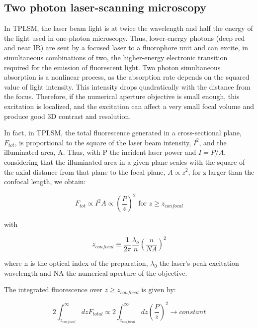 \subsection{Two photon laser-scanning microscopy }

In TPLSM, the laser beam light is at twice the wavelength and half the energy of the light used in one-photon microscopy. Thus, lower-energy photons (deep red and near IR) are sent by a focused laser to a fluorophore unit and can excite, in simultaneous combinations of two, the higher-energy electronic transition required for the emission of fluorescent light. Two photon simultaneous absorption is a nonlinear process, as the absorption rate depends on the squared value of light intensity. This intensity drops quadratically with the distance from the focus. Therefore, if the numerical aperture objective is small enough, this excitation is localized, and the excitation can affect a very small focal volume and produce good 3D contrast and resolution.

In fact, in TPLSM, the total fluorescence generated in a cross-sectional plane, $F_{tot}$, is proportional to the square of the laser beam intensity, $I^2$, and the illuminated area, A. Thus, with P the incident laser power and $I=P/A$, considering that the illuminated area in a given plane scales with the square of the axial distance from that plane to the focal plane, $A \propto z^2$, for z larger than the confocal length, we obtain:

\begin{equation}
F_ {tot} \propto I^2 A \propto \left( \dfrac{P}{z}\right)^2 \text{ for } z \geqslant z_{confocal}
\end{equation}

with

\begin{equation}
z_{confocal}\equiv \dfrac{1}{2 \pi} \dfrac{\lambda _o}{n} \left( \dfrac{n}{NA} \right)^2
\end{equation}

where n is the optical index of the preparation, $\lambda _0$ the laser's peak excitation wavelength and NA the numerical aperture of the objective.

The integrated fluorescence over $z \geqslant z_{confocal}$ is given by:

\begin{equation}
2 \int_{z_{confocal}}^{\infty} dz F_{total} \propto  2 \int_{z_{confocal}}^{\infty} dz \left( \dfrac{P}{z}\right)^2 \to constant
\end{equation}


